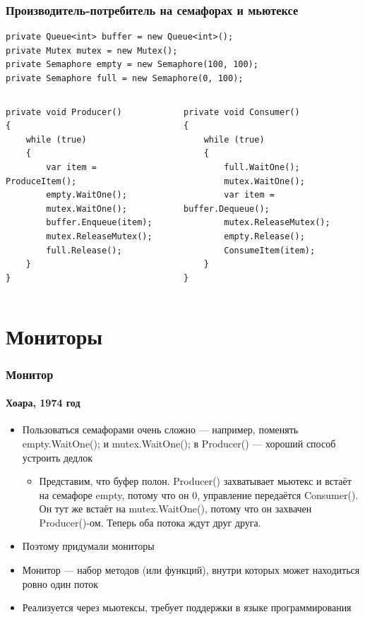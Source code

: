 \documentclass[xetex,mathserif,serif]{beamer}
\begin{document}
	\begin{frame}[fragile]
		\frametitle{Производитель-потребитель на семафорах и мьютексе}
		\begin{footnotesize}
			\begin{verbatim}
private Queue<int> buffer = new Queue<int>();
private Mutex mutex = new Mutex();
private Semaphore empty = new Semaphore(100, 100);
private Semaphore full = new Semaphore(0, 100);
			\end{verbatim}
			\begin{columns}
				\begin{column}{0.5\textwidth}
					\begin{verbatim}
private void Producer()
{
    while (true)
    {
        var item = ProduceItem();
        empty.WaitOne();
        mutex.WaitOne();
        buffer.Enqueue(item);
        mutex.ReleaseMutex();
        full.Release();
    }
}
					\end{verbatim}
				\end{column}
				\begin{column}{0.5\textwidth}
					\begin{verbatim}
private void Consumer()
{
    while (true)
    {
        full.WaitOne();
        mutex.WaitOne();
        var item = buffer.Dequeue();
        mutex.ReleaseMutex();
        empty.Release();
        ConsumeItem(item);
    }
}
					\end{verbatim}
				\end{column}
			\end{columns}
		\end{footnotesize}
	\end{frame}

	\section{Мониторы}

	\begin{frame}
		\frametitle{Монитор}
		\framesubtitle{Хоара, 1974 год}
		\begin{itemize}
			\item Пользоваться семафорами очень сложно --- например, поменять empty.WaitOne(); и mutex.WaitOne(); в Producer() --- хороший способ устроить дедлок
			\begin{itemize}
				\item Представим, что буфер полон. Producer() захватывает мьютекс и встаёт на семафоре empty, потому что он 0, управление передаётся Consumer(). Он тут же встаёт на mutex.WaitOne(), потому что он захвачен Producer()-ом. Теперь оба потока ждут друг друга.
			\end{itemize}
			\item Поэтому придумали мониторы
			\item Монитор --- набор методов (или функций), внутри которых может находиться ровно один поток
			\item Реализуется через мьютексы, требует поддержки в языке программирования
		\end{itemize}
	\end{frame}
\end{document}
